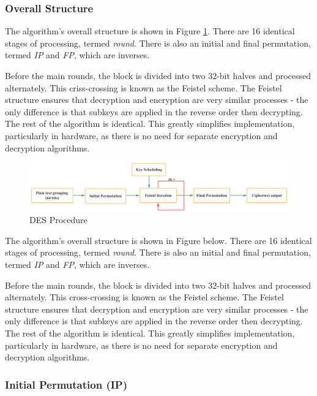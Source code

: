 \documentclass[11pt]{article}
\begin{document}
\subsubsection{Overall Structure}
The algorithm's overall structure\citep{de2007analysis} is shown in Figure \ref{fig:des_procedure}. There are 16 identical stages of processing, termed \textit{round}. There is also an initial and final permutation, termed \textit{IP} and \textit{FP}, which are inverses.

Before the main rounds, the block is divided into two 32-bit halves and processed alternately. This criss-crossing is known as the Feistel scheme. The Feistel structure ensures that decryption and encryption are very similar processes - the only difference is that subkeys are applied in the reverse order then decrypting. The rest of the algorithm is identical. This greatly simplifies implementation, particularly in hardware, as there is no need for separate encryption and decryption algorithms.

\begin{figure}[h!]
\centering
\includegraphics[scale=0.45]{des_procedure}
\caption{DES Procedure}
\label{fig:des_procedure}
\end{figure}

The algorithm's overall structure is shown in Figure below. There are 16 identical stages of processing, termed \textit{round}. There is also an initial and final permutation, termed \textit{IP} and \textit{FP}, which are inverses.

Before the main rounds, the block is divided into two 32-bit halves and processed alternately. This cross-crossing is known as the Feistel scheme. The Feistel structure ensures that decryption and encryption are very similar processes - the only difference is that subkeys are applied in the reverse order then decrypting. The rest of the algorithm is identical. This greatly simplifies implementation, particularly in hardware, as there is no need for separate encryption and decryption algorithms.

\subsubsection{Initial Permutation (IP)}
\end{document}
